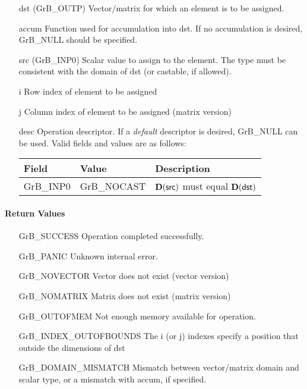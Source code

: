 \begin{itemize}[leftmargin=1.1in]
    \item[{\sf dst}]   ({\sf GrB\_OUTP}) Vector/matrix for which an element is to be assigned.

    \item[{\sf accum}] Function used for accumulation into {\sf dst}.  If no accumulation
                        is desired, {\sf GrB\_NULL} should be specified.

    \item[{\sf src}]   ({\sf GrB\_INP0}) Scalar value to assign to the element.  The type must
                              be consistent with the domain of dst (or castable, if allowed).
    \item[{\sf i}]     Row index of element to be assigned
    \item[{\sf j}]     Column index of element to be assigned (matrix version)

    \item[{\sf desc}]   Operation descriptor. If a
    \emph{default} descriptor is desired, {\sf GrB\_NULL} can be
    used. Valid fields and values are as follows: \\
    \begin{tabular}{llp{3in}}
    Field  & Value & Description \\
    \hline
    {\sf GrB\_INP0} & {\sf GrB\_NOCAST} & $\bold{D}({\sf src})$ must equal $\bold{D}({\sf dst})$ \\
    \end{tabular}

\end{itemize}

\paragraph{Return Values}

\begin{itemize}[leftmargin=2.1in]
\item[{\sf GrB\_SUCCESS}]             Operation completed successfully.
\item[{\sf GrB\_PANIC}]               Unknown internal error.
\item[{\sf GrB\_NOVECTOR}]            Vector does not exist (vector version)
\item[{\sf GrB\_NOMATRIX}]            Matrix does not exist (matrix version)
\item[{\sf GrB\_OUTOFMEM}]            Not enough memory available for operation.
\item[{\sf GrB\_INDEX\_OUTOFBOUNDS}]  The i (or j) indexes specify a position that outside the dimensions of dst
\item[{\sf GrB\_DOMAIN\_MISMATCH}]    Mismatch between vector/matrix domain and scalar type,
                                      or a mismatch with {\sf accum}, if specified.
\end{itemize}

